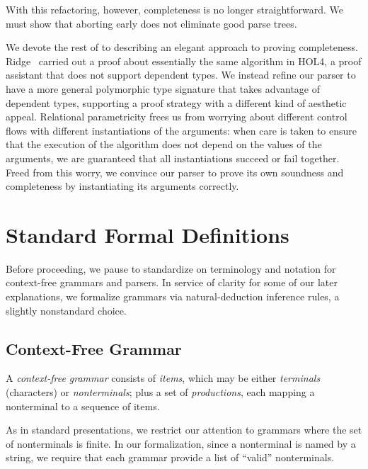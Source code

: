 
    With this refactoring, however, completeness is no longer straightforward.  We must show that aborting early does not eliminate good parse trees.

    We devote the rest of  to describing an elegant approach to proving completeness.  Ridge~\cite{Ridge} carried out a proof about essentially the same algorithm in HOL4, a proof assistant that does not support dependent types.  We instead refine our parser to have a more general polymorphic type signature that takes advantage of dependent types, supporting a proof strategy with a different kind of aesthetic appeal.  Relational parametricity frees us from worrying about different control flows with different instantiations of the arguments: when care is taken to ensure that the execution of the algorithm does not depend on the values of the arguments, we are guaranteed that all instantiations succeed or fail together.  Freed from this worry, we convince our parser to prove its own soundness and completeness by instantiating its arguments correctly.

\section{Standard Formal Definitions} \label{sec:standard-definitions}
  Before proceeding, we pause to standardize on terminology and notation for context-free grammars and parsers.  In service of clarity for some of our later explanations, we formalize grammars via natural-deduction inference rules, a slightly nonstandard choice.

  \subsection{Context-Free Grammar}
    A \emph{context-free grammar} consists of \emph{items}, which may be either \emph{terminals} (characters) or \emph{nonterminals}; plus a set of \emph{productions}, each mapping a nonterminal to a sequence of items.
    
    As in standard presentations, we restrict our attention to grammars where the set of nonterminals is finite.  In our formalization, since a nonterminal is named by a string, we require that each grammar provide a list of ``valid'' nonterminals. 

